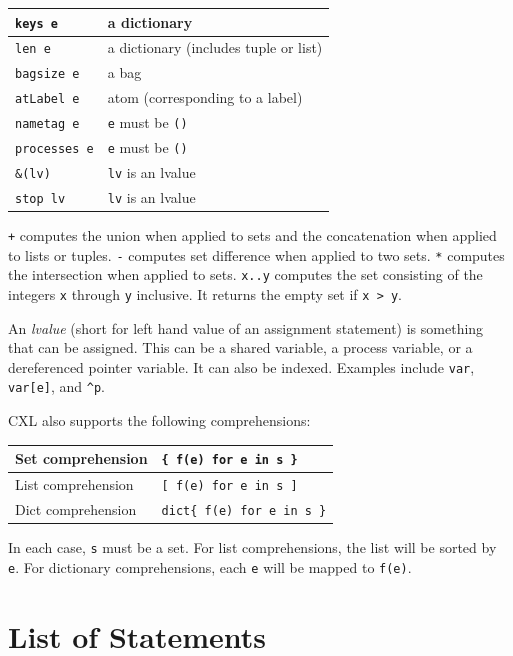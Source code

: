 \documentclass{report}
\begin{document}
\begin{tabular}{|l|l|}
\hline
\texttt{keys e} & a dictionary \\
\hline
\texttt{len e} & a dictionary (includes tuple or list) \\
\hline
\texttt{bagsize e} & a bag \\
\hline
\texttt{atLabel e} & atom (corresponding to a label) \\
\hline
\texttt{nametag e} & \texttt{e} must be \texttt{()} \\
\hline
\texttt{processes e} & \texttt{e} must be \texttt{()} \\
\hline
\texttt{\&(lv)} & \texttt{lv} is an lvalue \\
\hline
\texttt{stop lv} & \texttt{lv} is an lvalue \\
\hline
\end{tabular}
\vspace{1em}

\texttt{+} computes the union when applied to sets and
the concatenation when applied to lists or tuples.
\texttt{-} computes set difference when applied to two sets.
\texttt{*} computes the intersection when applied to sets.
\texttt{x..y} computes the set consisting of the integers \texttt{x}
through \texttt{y} inclusive.  It returns the empty set if \texttt{x > y}.

An \emph{lvalue}
(short for left hand value of an assignment statement)
is something that can be assigned.  This can be a
shared variable, a process variable, or a dereferenced pointer
variable.  It can also be indexed.  Examples include
\texttt{var}, \texttt{var[e]}, and \texttt{\^{}p}.

CXL also supports the following comprehensions:

\vspace{1em}
\begin{tabular}{|l|l|}
\hline
Set comprehension & \texttt{\{ f(e) for e in s \}} \\
\hline
List comprehension & \texttt{[ f(e) for e in s ]} \\
\hline
Dict comprehension & \texttt{dict\{ f(e) for e in s \}} \\
\hline
\end{tabular}
\vspace{1em}

In each case, \texttt{s} must be a set.
For list comprehensions, the list will be sorted by \texttt{e}.
For dictionary comprehensions, each \texttt{e} will be mapped to \texttt{f(e)}.

\chapter{List of Statements}
\end{document}
